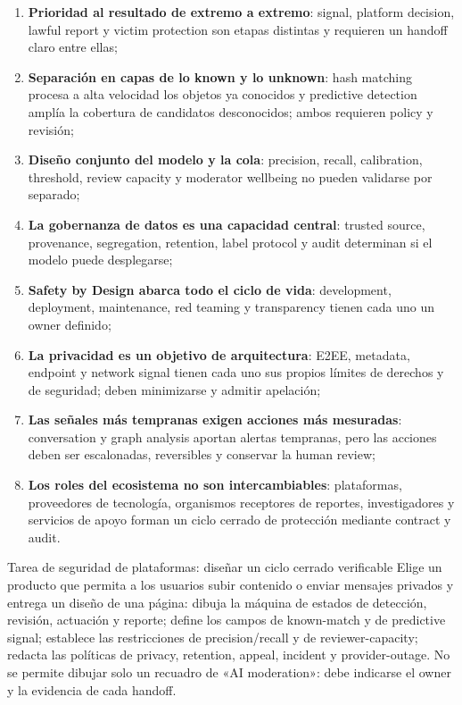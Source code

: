 \documentclass[a4paper]{article}
\begin{document}
\begin{enumerate}
  \item \textbf{Prioridad al resultado de extremo a extremo}: signal, platform decision, lawful report y victim protection son etapas distintas y requieren un handoff claro entre ellas;
  \item \textbf{Separación en capas de lo known y lo unknown}: hash matching procesa a alta velocidad los objetos ya conocidos y predictive detection amplía la cobertura de candidatos desconocidos; ambos requieren policy y revisión;
  \item \textbf{Diseño conjunto del modelo y la cola}: precision, recall, calibration, threshold, review capacity y moderator wellbeing no pueden validarse por separado;
  \item \textbf{La gobernanza de datos es una capacidad central}: trusted source, provenance, segregation, retention, label protocol y audit determinan si el modelo puede desplegarse;
  \item \textbf{Safety by Design abarca todo el ciclo de vida}: development, deployment, maintenance, red teaming y transparency tienen cada uno un owner definido;
  \item \textbf{La privacidad es un objetivo de arquitectura}: E2EE, metadata, endpoint y network signal tienen cada uno sus propios límites de derechos y de seguridad; deben minimizarse y admitir apelación;
  \item \textbf{Las señales más tempranas exigen acciones más mesuradas}: conversation y graph analysis aportan alertas tempranas, pero las acciones deben ser escalonadas, reversibles y conservar la human review;
  \item \textbf{Los roles del ecosistema no son intercambiables}: plataformas, proveedores de tecnología, organismos receptores de reportes, investigadores y servicios de apoyo forman un ciclo cerrado de protección mediante contract y audit.
\end{enumerate}

\begin{importantbox}{Tarea de seguridad de plataformas: diseñar un ciclo cerrado verificable}
Elige un producto que permita a los usuarios subir contenido o enviar mensajes privados y entrega un diseño de una página: dibuja la máquina de estados de detección, revisión, actuación y reporte; define los campos de known-match y de predictive signal; establece las restricciones de precision/recall y de reviewer-capacity; redacta las políticas de privacy, retention, appeal, incident y provider-outage. No se permite dibujar solo un recuadro de «AI moderation»: debe indicarse el owner y la evidencia de cada handoff.
\end{importantbox}
\end{document}

